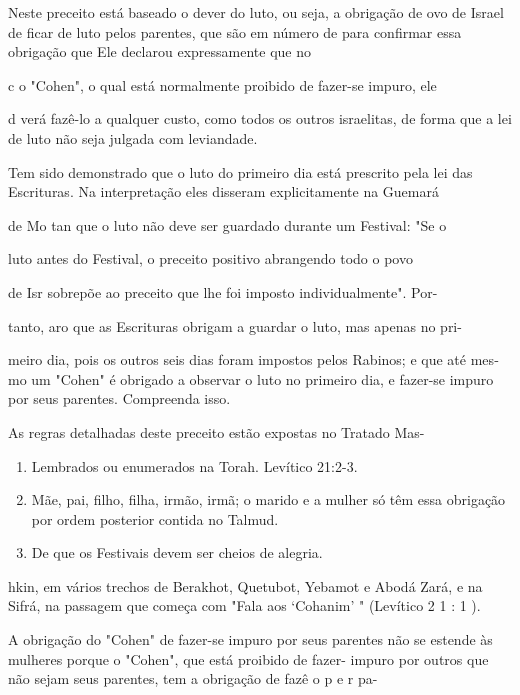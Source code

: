 \begin{itemize}
\begin{enumrate}
\begin{itemize}
\begin{itemize}
Neste preceito está baseado o dever do luto, ou seja, a obrigação de ovo
de Israel de ficar de luto pelos parentes, que são em número de para
confirmar essa obrigação que Ele declarou expressamente que no


c o "Cohen", o qual está normalmente proibido de fazer-se impuro, ele

d verá fazê-lo a qualquer custo, como todos os outros israelitas, de
forma que a lei de luto não seja julgada com leviandade.

Tem sido demonstrado que o luto do primeiro dia está prescrito pe­la lei
das Escrituras. Na interpretação eles disseram explicitamente na Guemará

de Mo tan que o luto não deve ser guardado durante um Festival: "Se o

luto antes do Festival, o preceito positivo abrangendo todo o povo

de Isr sobrepõe ao preceito que lhe foi imposto individualmente". Por-

tanto, aro que as Escrituras obrigam a guardar o luto, mas apenas no
pri-

meiro dia, pois os outros seis dias foram impostos pelos Rabinos; e que
até mes­mo um "Cohen" é obrigado a observar o luto no primeiro dia, e
fazer-se impu­ro por seus parentes. Compreenda isso.


As regras detalhadas deste preceito estão expostas no Tratado Mas-

\begin{enumerate}
\def\labelenumi{\arabic{enumi}.}
\setcounter{enumi}{60}
\item
 
 Lembrados ou enumerados na Torah. Levítico 21:2-3.
 
\item
 
 Mãe, pai, filho, filha, irmão, irmã; o marido e a mulher só têm essa
 obrigação por ordem poste­rior contida no Talmud.
 
\item
 
 De que os Festivais devem ser cheios de alegria.
 
\end{enumerate}

hkin, em vários trechos de Berakhot, Quetubot, Yebamot e Abodá Zará, e
na Sifrá, na passagem que começa com "Fala aos `Cohanim' " (Levítico 2 1
: 1 ).

A obrigação do "Cohen" de fazer-se impuro por seus parentes não se
estende às mulheres porque o "Cohen", que está proibido de fazer-
impu­ro por outros que não sejam seus parentes, tem a obrigação de fazê
o p e r pa-


\end{itemize}
\end{itemize}
\end{enumrate}
\end{itemize}
